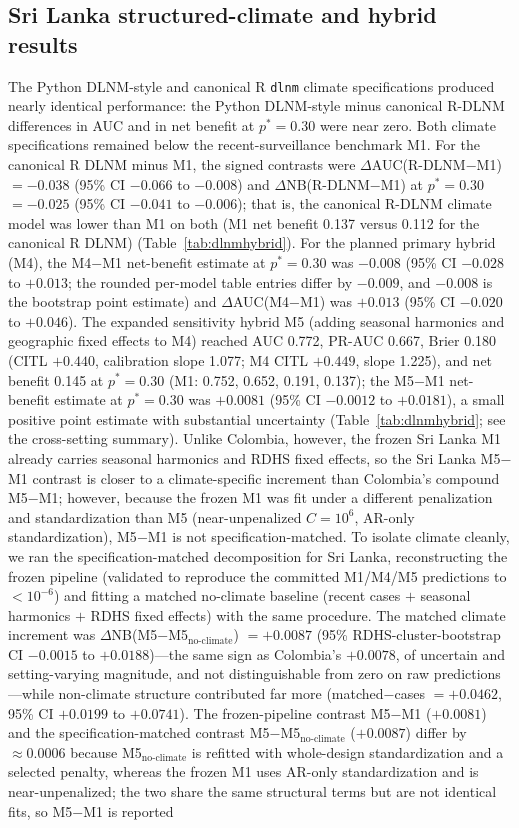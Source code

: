 \documentclass[11pt,a4paper]{article}
\begin{document}
\subsection{Sri Lanka structured-climate and hybrid results}
The Python DLNM-style and canonical R \texttt{dlnm} climate specifications produced nearly identical performance: the Python DLNM-style minus canonical R-DLNM differences in AUC and in net benefit at $p^*=0.30$ were near zero. Both climate specifications remained below the recent-surveillance benchmark M1. For the canonical R DLNM minus M1, the signed contrasts were $\Delta$AUC(R\nobreakdash-DLNM$-$M1) $=-0.038$ (95\% CI $-0.066$ to $-0.008$) and $\Delta$NB(R\nobreakdash-DLNM$-$M1) at $p^*=0.30$ $=-0.025$ (95\% CI $-0.041$ to $-0.006$); that is, the canonical R-DLNM climate model was lower than M1 on both (M1 net benefit 0.137 versus 0.112 for the canonical R DLNM) (Table~\ref{tab:dlnmhybrid}). For the planned primary hybrid (M4), the M4$-$M1 net-benefit estimate at $p^*=0.30$ was $-0.008$ (95\% CI $-0.028$ to $+0.013$; the rounded per-model table entries differ by $-0.009$, and $-0.008$ is the bootstrap point estimate) and $\Delta$AUC(M4$-$M1) was $+0.013$ (95\% CI $-0.020$ to $+0.046$). The expanded sensitivity hybrid M5 (adding seasonal harmonics and geographic fixed effects to M4) reached AUC 0.772, PR-AUC 0.667, Brier 0.180 (CITL $+0.440$, calibration slope 1.077; M4 CITL $+0.449$, slope 1.225), and net benefit 0.145 at $p^*=0.30$ (M1: 0.752, 0.652, 0.191, 0.137); the M5$-$M1 net-benefit estimate at $p^*=0.30$ was $+0.0081$ (95\% CI $-0.0012$ to $+0.0181$), a small positive point estimate with substantial uncertainty (Table~\ref{tab:dlnmhybrid}; see the cross-setting summary). Unlike Colombia, however, the frozen Sri Lanka M1 already carries seasonal harmonics and RDHS fixed effects, so the Sri Lanka M5$-$M1 contrast is closer to a climate-specific increment than Colombia's compound M5$-$M1; however, because the frozen M1 was fit under a different penalization and standardization than M5 (near-unpenalized $C{=}10^{6}$, AR-only standardization), M5$-$M1 is not specification-matched. To isolate climate cleanly, we ran the specification-matched decomposition for Sri Lanka, reconstructing the frozen pipeline (validated to reproduce the committed M1/M4/M5 predictions to $<10^{-6}$) and fitting a matched no-climate baseline (recent cases $+$ seasonal harmonics $+$ RDHS fixed effects) with the same procedure. The matched climate increment was $\Delta$NB(M5$-$M5$_{\text{no-climate}}$) $=+0.0087$ (95\% RDHS-cluster-bootstrap CI $-0.0015$ to $+0.0188$)---the same sign as Colombia's $+0.0078$, of uncertain and setting-varying magnitude, and not distinguishable from zero on raw predictions---while non-climate structure contributed far more (matched$-$cases $=+0.0462$, 95\% CI $+0.0199$ to $+0.0741$). The frozen-pipeline contrast M5$-$M1 ($+0.0081$) and the specification-matched contrast M5$-$M5$_{\text{no-climate}}$ ($+0.0087$) differ by $\approx0.0006$ because M5$_{\text{no-climate}}$ is refitted with whole-design standardization and a selected penalty, whereas the frozen M1 uses AR-only standardization and is near-unpenalized; the two share the same structural terms but are not identical fits, so M5$-$M1 is reported 
\end{document}
